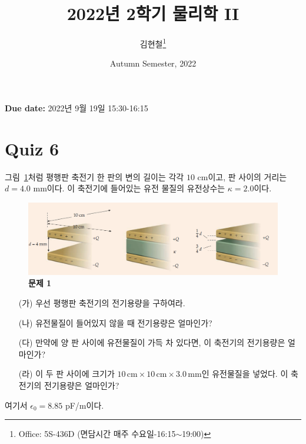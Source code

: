 \documentclass[tightenlines,floatfix,nofootinbib,superscriptaddress,fleqn]{revtex4-2}
\begin{document}
\title{\Large 2022년 2학기 물리학 II}
\author{김현철\footnote{Office: 5S-436D (면담시간 매주
    수요일-16:15$\sim$19:00)}} 
\date{Autumn Semester, 2022}

\maketitle

{\color{red} {\bf Due date:} 2022년 9월 19일  15:30-16:15 }
\vspace{1.cm}

\section*{\large Quiz 6}
그림~\ref{fig:1}처럼 평행판 축전기 한 판의 변의 길이는 각각 $10$
cm이고, 판 사이의 거리는 $d=4.0$ mm이다. 이 축전기에 들어있는 유전
물질의 유전상수는 $\kappa=2.0$이다. 
\begin{figure}[htp]
  \centering
  \includegraphics[scale=0.6]{qfig6-20220919-2.png}
  \caption{\textbf{문제 1}}
  \label{fig:1}
\end{figure}
\begin{itemize}
\item[(가)] 우선 평행판 축전기의 전기용량을 구하여라. 
\item[(나)] 유전물질이 들어있지 않을 때 전기용량은 얼마인가?  
\item[(다)] 만약에 양 판 사이에 유전물질이 가득 차 있다면, 이 축전기의
  전기용량은 얼마인가? 
\item[(라)] 이 두 판 사이에 크기가 $10\,\mathrm{cm}\times
  10\,\mathrm{cm}\times 3.0\,\mathrm{mm}$인 유전물질을 넣었다. 이
  축전기의 전기용량은 얼마인가? 
\end{itemize}
여기서 $\epsilon_0=8.85$ pF/m이다. 
\end{document}
